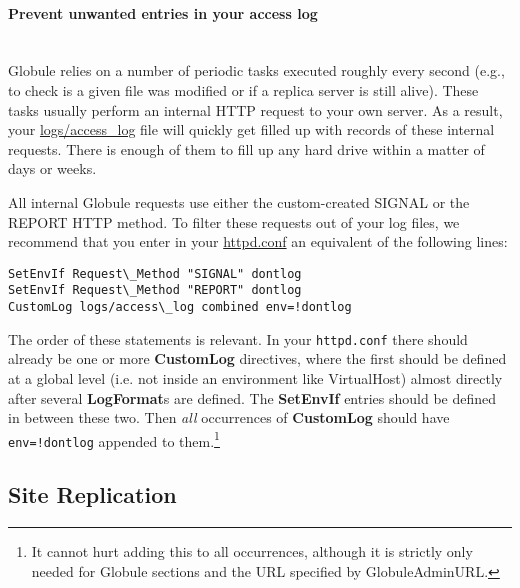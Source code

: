 \documentclass[10pt,a4paper]{article}
\makeatletter
\newenvironment{p}{\@open{P}{}}{\@close{P}}
\newenvironment{p}{}{\par}
\newcommand\subsectionbr{}
\makeatother
\begin{document}
\paragraph{Prevent unwanted entries in your access log}~\\

\begin{p}
Globule relies on a number of periodic tasks executed roughly every second
(e.g., to check is a given file was modified or if a replica server is still
alive). These tasks usually perform an internal HTTP request to your own
server. As a result, your \url{logs/access_log} file will quickly get filled
up with records of these internal requests. There is enough of them to fill up
any hard drive within a matter of days or weeks.
\end{p}

\begin{p}
All internal Globule requests use either the custom-created SIGNAL or the
REPORT HTTP method.  To filter these requests out of your log files, we
recommend that you enter in your \url{httpd.conf} an equivalent of the
following lines:
\end{p}

\begin{Verbatim}
SetEnvIf Request\_Method "SIGNAL" dontlog 
SetEnvIf Request\_Method "REPORT" dontlog
CustomLog logs/access\_log combined env=!dontlog
\end{Verbatim}

\begin{p}
The order of these statements is relevant.  In your \verb!httpd.conf! there
should already be one or more \textbf{CustomLog} directives, where the first
should be defined at a global level (i.e. not inside an environment like
VirtualHost) almost directly after several \textbf{LogFormat}s are defined.
The \textbf{SetEnvIf} entries should be defined in between these two.  Then
\emph{all} occurrences of \textbf{CustomLog} should have \verb|env=!dontlog|
appended to them.\footnote{It cannot hurt adding this to all occurrences,
although it is strictly only needed for Globule sections and the URL specified
by GlobuleAdminURL.}
\end{p}


\newpage
\subsection{\label{sec:repl}
  Site Replication\subsectionbr}
\end{document}
